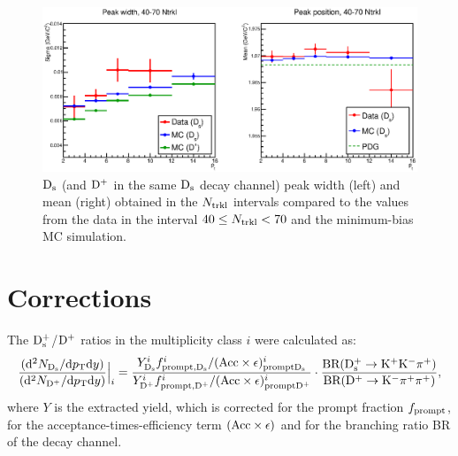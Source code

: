 \begin{figure}[htpb]
\centering
 \includegraphics[width=.9\textwidth]{FigCap6/DsMeanSigma_DataMC_4070_Ntrkl.eps}
  \caption{${\rm D_s}$ (and ${\rm D^+}$ in the same ${\rm D_s}$ decay channel) peak width (left) and mean (right) obtained in the $N_{\rm trkl}$ intervals compared to the values from the data in the interval $40 \leq N_{\rm trkl} < 70$ and the minimum-bias MC simulation.}
 \label{fig:DsFitParamsVsNtrkl}
\end{figure}

\section{Corrections}
\label{sec:Corrections}
The ${\rm D_s^+}$/${\rm D^+}$ ratios in the multiplicity class $i$ were calculated
as:
\begin{equation} 
\label{eq:NtrklCorr}
 \frac{({\rm d}^2N_{{\rm D_s}}/{\rm d}p_{\rm T} {\rm d}y)}{({\rm d}^2N_{{\rm D^+}}/{\rm d}p_{\rm T} {\rm d}y)} \Big |_i = \frac{Y^i_{{\rm D_s}}  f^i_{\rm prompt, {\rm D_s}} / ({\rm Acc} \times \epsilon)^i_{\rm prompt {\rm D_s}}}{Y^i_{{\rm D^+}}  f^i_{\rm prompt, {\rm D^+}} / ({\rm Acc} \times \epsilon)^i_{\rm prompt {\rm D^+}}} \cdot \frac{\rm BR({\rm D^{+}_\mathrm{s}\to K^+ K^-\pi^+})}{\rm BR({\rm D}^+\to {\rm K}^-\pi^+\pi^+)},
\end{equation}
where $Y$ is the extracted yield, which is corrected for the prompt fraction
$f_{\rm prompt}$, for the acceptance-times-efficiency term $({\rm Acc} \times \epsilon)$ and for
the branching ratio BR of the decay channel.\\



